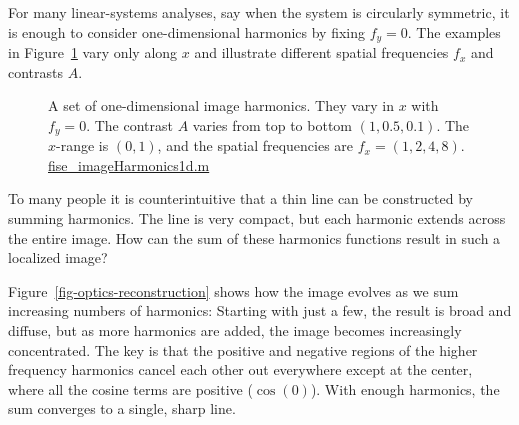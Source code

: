 \documentclass[
  letterpaper,
]{book}
\begin{document}
For many linear-systems analyses, say when the system is circularly
symmetric, it is enough to consider one-dimensional harmonics by fixing
\(f_y = 0\). The examples in Figure~\ref{fig-optics-harmonics-1d} vary
only along \(x\) and illustrate different spatial frequencies \(f_x\)
and contrasts \(A\).

\begin{figure}


\caption{\label{fig-optics-harmonics-1d}A set of one-dimensional image
harmonics. They vary in \(x\) with \(f_y = 0\). The contrast \(A\)
varies from top to bottom \((1, 0.5, 0.1)\). The \(x\)-range is
\((0,1)\), and the spatial frequencies are \(f_x = (1, 2, 4, 8)\).
\href{../code/02Optics/fise_imageHarmonics1d.html}{fise\_imageHarmonics1d.m}}

\end{figure}%

To many people it is counterintuitive that a thin line can be
constructed by summing harmonics. The line is very compact, but each
harmonic extends across the entire image. How can the sum of these
harmonics functions result in such a localized image?

Figure~\ref{fig-optics-reconstruction} shows how the image evolves as we
sum increasing numbers of harmonics: Starting with just a few, the
result is broad and diffuse, but as more harmonics are added, the image
becomes increasingly concentrated. The key is that the positive and
negative regions of the higher frequency harmonics cancel each other out
everywhere except at the center, where all the cosine terms are positive
(\(\cos(0)\)). With enough harmonics, the sum converges to a single,
sharp line.
\end{document}
